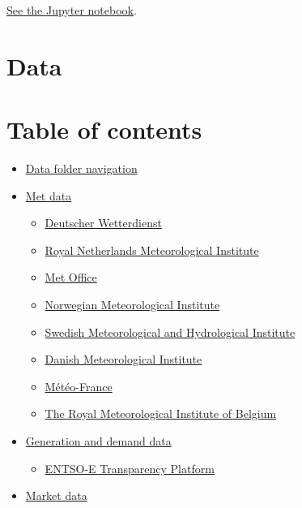 \href{https://github.com/ENSYSTRA/short-term-forecasting/tree/master/jupyter-notebooks/NUTS.ipynb}{See
the Jupyter notebook}.

\hypertarget{data}{%
\section{Data}\label{data}}

\hypertarget{table-of-contents-omit-in-toc-}{%
\section{Table of contents}\label{table-of-contents-omit-in-toc-}}

\begin{itemize}
\tightlist
\item
  \protect\hyperlink{data-folder-navigation}{Data folder navigation}
\item
  \protect\hyperlink{met-data}{Met data}

  \begin{itemize}
  \tightlist
  \item
    \protect\hyperlink{deutscher-wetterdienst}{Deutscher Wetterdienst}
  \item
    \protect\hyperlink{royal-netherlands-meteorological-institute}{Royal
    Netherlands Meteorological Institute}
  \item
    \protect\hyperlink{met-office}{Met Office}
  \item
    \protect\hyperlink{norwegian-meteorological-institute}{Norwegian
    Meteorological Institute}
  \item
    \protect\hyperlink{swedish-meteorological-and-hydrological-institute}{Swedish
    Meteorological and Hydrological Institute}
  \item
    \protect\hyperlink{danish-meteorological-institute}{Danish
    Meteorological Institute}
  \item
    \protect\hyperlink{mto-france}{Météo-France}
  \item
    \protect\hyperlink{the-royal-meteorological-institute-of-belgium}{The
    Royal Meteorological Institute of Belgium}
  \end{itemize}
\item
  \protect\hyperlink{generation-and-demand-data}{Generation and demand
  data}

  \begin{itemize}
  \tightlist
  \item
    \protect\hyperlink{entso-e-transparency-platform}{ENTSO-E
    Transparency Platform}
  \end{itemize}
\item
  \protect\hyperlink{market-data}{Market data}


\end{itemize}
